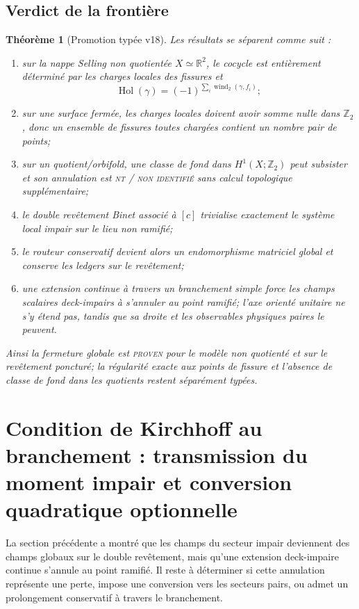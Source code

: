 \documentclass[11pt,a4paper]{article}
\newtheorem{theorem}{Théorème}[section]
\newcommand{\statusNT}{\textsc{nt / non identifié}}
\begin{document}
\subsection{Verdict de la frontière}

\begin{theorem}[Promotion typée v18]\label{thm:v18-verdict}
Les résultats se séparent comme suit :
\begin{enumerate}[label=\textup{(\roman*)}]
\item sur la nappe Selling non quotientée $X\simeq\mathbb R^2$, le cocycle est entièrement déterminé par les charges locales des fissures et
\[
 \operatorname{Hol}(\gamma)=(-1)^{\sum_i\operatorname{wind}_2(\gamma,f_i)};
\]
\item sur une surface fermée, les charges locales doivent avoir somme nulle dans $\mathbb Z_2$, donc un ensemble de fissures toutes chargées contient un nombre pair de points;
\item sur un quotient/orbifold, une classe de fond dans $H^1(X;\mathbb Z_2)$ peut subsister et son annulation est \statusNT{} sans calcul topologique supplémentaire;
\item le double revêtement Binet associé à $[c]$ trivialise exactement le système local impair sur le lieu non ramifié;
\item le routeur conservatif devient alors un endomorphisme matriciel global et conserve les ledgers sur le revêtement;
\item une extension continue à travers un branchement simple force les champs scalaires deck-impairs à s'annuler au point ramifié; l'axe orienté unitaire ne s'y étend pas, tandis que sa droite et les observables physiques paires le peuvent.
\end{enumerate}
Ainsi la fermeture globale est \textsc{proven} pour le modèle non quotienté et sur le revêtement poncturé; la régularité exacte aux points de fissure et l'absence de classe de fond dans les quotients restent séparément typées.
\end{theorem}


\section{Condition de Kirchhoff au branchement : transmission du moment impair et conversion quadratique optionnelle}\label{sec:v19-branch-kirchhoff}

La section précédente a montré que les champs du secteur impair deviennent des champs globaux sur le double revêtement, mais qu'une extension deck-impaire continue s'annule au point ramifié. Il reste à déterminer si cette annulation représente une perte, impose une conversion vers les secteurs pairs, ou admet un prolongement conservatif à travers le branchement.
\end{document}
